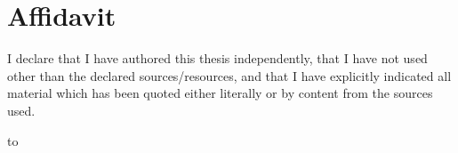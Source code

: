 

\section*{Affidavit}
I declare that I have authored this thesis independently, that I have
not used other than the declared sources/resources, and that I have
explicitly indicated all material which has been quoted either
literally or by content from the sources used. 

\hbox to 
